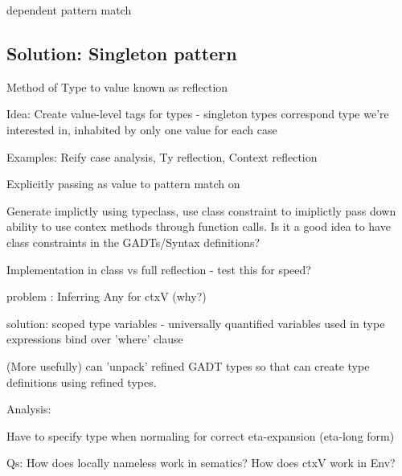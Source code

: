 dependent pattern match \cite{SingletonsGuide}

\subsection{Solution: Singleton pattern}

Method of Type to value known as reflection \cite{SingletonsGuide}

Idea: Create value-level tags for types - singleton types correspond type we're interested in, inhabited by only one value for each case

Examples: Reify case analysis, Ty reflection, Context reflection

Explicitly passing as value to pattern match on

Generate implictly using typeclass, use class constraint to imiplictly pass down ability to use contex methods through function calls.
Is it a good idea to have class constraints in the GADTs/Syntax definitions?

Implementation in class vs full reflection - test this for speed?

problem : Inferring Any for ctxV (why?)

solution: scoped type variables - universally quantified variables used in type expressions bind over 'where' clause

(More usefully) can 'unpack' refined GADT types so that can create type definitions using refined types.

Analysis:

Have to specify type when normaling for correct eta-expansion (eta-long form)

Qs:
How does locally nameless work in sematics?
How does ctxV work in Env?
